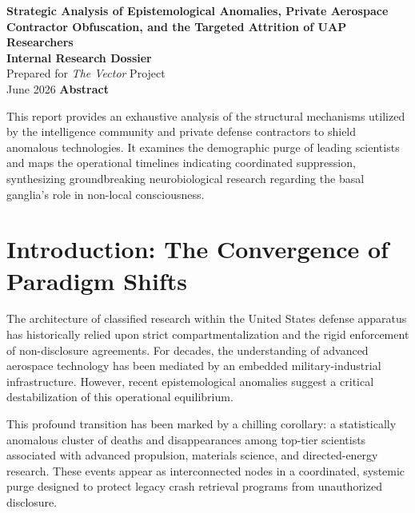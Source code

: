 \documentclass[11pt,a4paper]{article}
\begin{document}
\begin{titlepage}
    \begin{center}
        \vspace*{1in}
        {\Huge\bfseries\color{vectorBlue} Strategic Analysis of Epistemological Anomalies, Private Aerospace Contractor Obfuscation, and the Targeted Attrition of UAP Researchers} \\
        \vspace{1.5cm}
        {\Large\bfseries\color{accentRust} Internal Research Dossier} \\
        \vspace{1cm}
        {\large Prepared for \textit{The Vector} Project} \\
        \vspace{0.5cm}
        {\large June 2026}
        \vfill
        \textbf{Abstract} \\
        \vspace{0.3cm}
        \begin{minipage}{0.8\textwidth}
            This report provides an exhaustive analysis of the structural mechanisms utilized by the intelligence community and private defense contractors to shield anomalous technologies. It examines the demographic purge of leading scientists and maps the operational timelines indicating coordinated suppression, synthesizing groundbreaking neurobiological research regarding the basal ganglia's role in non-local consciousness.
        \end{minipage}
    \end{center}
\end{titlepage}

\section{Introduction: The Convergence of Paradigm Shifts}
The architecture of classified research within the United States defense apparatus has historically relied upon strict compartmentalization and the rigid enforcement of non-disclosure agreements. For decades, the understanding of advanced aerospace technology has been mediated by an embedded military-industrial infrastructure. However, recent epistemological anomalies suggest a critical destabilization of this operational equilibrium. 

This profound transition has been marked by a chilling corollary: a statistically anomalous cluster of deaths and disappearances among top-tier scientists associated with advanced propulsion, materials science, and directed-energy research. These events appear as interconnected nodes in a coordinated, systemic purge designed to protect legacy crash retrieval programs from unauthorized disclosure. 
\end{document}
